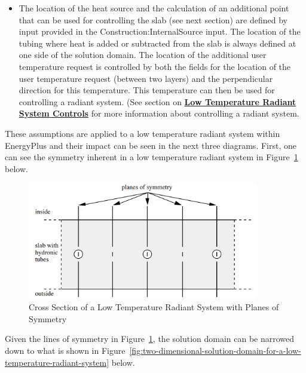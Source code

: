 \begin{itemize}
\item
The location of the heat source and the calculation of an additional point that can be used for controlling the slab (see next section) are defined by input provided in the Construction:InternalSource input.  The location of the tubing where heat is added or subtracted from the slab is always defined at one side of the solution domain.  The location of the additional user temperature request is controlled by both the fields for the location of the user temperature request (between two layers) and the perpendicular direction for this temperature.  This temperature can then be used for controlling a radiant system.  (See section on \textbf{\hyperref[low-temperature-radiant-system-controls]{Low Temperature Radiant System Controls}} for more information about controlling a radiant system.
\end{itemize}

These assumptions are applied to a low temperature radiant system within EnergyPlus and their impact can be seen in the next three diagrams.  First, one can see the symmetry inherent in a low temperature radiant system in Figure~\ref{fig:cross-section-of-a-low-temperature-radiant-system-with-planes-of-symmetry} below.

\begin{figure}[hbtp] %
\centering
\includegraphics[width=0.9\textwidth, height=0.9\textheight, keepaspectratio=true]{media/RadSys2DCrossSection.png}
\caption{Cross Section of a Low Temperature Radiant System with Planes of Symmetry \protect \label{fig:cross-section-of-a-low-temperature-radiant-system-with-planes-of-symmetry}}
\end{figure}

Given the lines of symmetry in Figure~\ref{fig:cross-section-of-a-low-temperature-radiant-system-with-planes-of-symmetry}, the solution domain can be narrowed down to what is shown in Figure~\ref{fig:two-dimensional-solution-domain-for-a-low-temperature-radiant-system} below.

